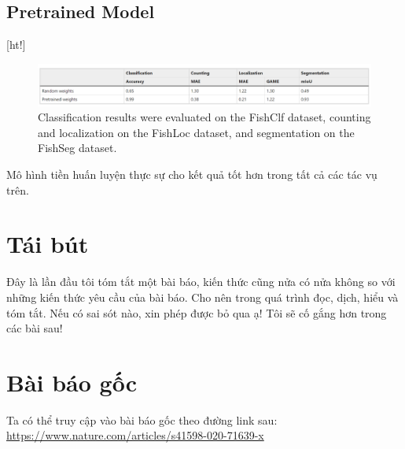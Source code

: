 \documentclass{article}
\begin{document}
        \subsection{Pretrained Model}[ht!]
        \begin{figure}
            \centering
            \includegraphics[width = \linewidth]{fig5.png}
            \caption{Classification results were evaluated on the FishClf dataset, counting and localization on the FishLoc dataset, and segmentation on the FishSeg dataset.}
            \label{fig5}
        \end{figure}
        Mô hình tiền huấn luyện thực sự cho kết quả tốt hơn trong tất cả các tác vụ trên.
        \section{Tái bút}
        Đây là lần đầu tôi tóm tắt một bài báo, kiến thức cũng nửa có nửa không so với những kiến thức yêu cầu của bài báo. Cho nên trong quá trình đọc, dịch, hiểu và tóm tắt. Nếu có sai sót nào, xin phép được bỏ qua ạ! Tôi sẽ cố gắng hơn trong các bài sau!
        \section{Bài báo gốc}
        Ta có thể truy cập vào bài báo gốc theo đường link sau:
        \url{https://www.nature.com/articles/s41598-020-71639-x}
\end{document}

